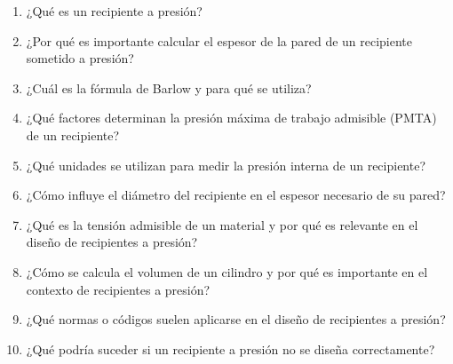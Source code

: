 \documentclass[../main]{subfiles}
\begin{document}
\begin{enumerate}
\item ¿Qué es un recipiente a presión?
\item ¿Por qué es importante calcular el espesor de la pared de un recipiente sometido a presión?
\item ¿Cuál es la fórmula de Barlow y para qué se utiliza?
\item ¿Qué factores determinan la presión máxima de trabajo admisible (PMTA) de un recipiente?
\item ¿Qué unidades se utilizan para medir la presión interna de un recipiente?
\item ¿Cómo influye el diámetro del recipiente en el espesor necesario de su pared?
\item ¿Qué es la tensión admisible de un material y por qué es relevante en el diseño de recipientes a presión?
\item ¿Cómo se calcula el volumen de un cilindro y por qué es importante en el contexto de recipientes a presión?
\item ¿Qué normas o códigos suelen aplicarse en el diseño de recipientes a presión?
\item ¿Qué podría suceder si un recipiente a presión no se diseña correctamente?
\end{enumerate}
\end{document}
